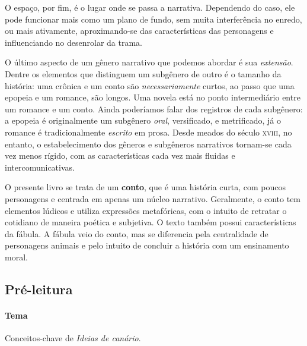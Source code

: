 \documentclass[11pt]{extarticle}
\begin{document}
O espaço, por fim, é o lugar onde se passa a narrativa. Dependendo do caso, ele pode funcionar mais como um plano de fundo, sem muita interferência no enredo, ou mais ativamente, aproximando-se das características das personagens e influenciando no desenrolar da trama. 


O último aspecto de um gênero narrativo que podemos abordar é sua \textit{extensão}. Dentre os elementos que distinguem um subgênero de outro é o tamanho da história: uma crônica e um conto são \textit{necessariamente} curtos, ao passo que uma epopeia e um romance, são longos. Uma novela está no ponto intermediário entre um romance e um conto. Ainda poderíamos falar dos registros de cada subgênero: a epopeia é originalmente um subgênero \textit{oral}, versificado, e metrificado, já o romance é tradicionalmente \textit{escrito} em prosa.  Desde meados do século \textsc{xviii}, no entanto, o estabelecimento dos gêneros e subgêneros narrativos tornam-se cada vez menos rígido, com as características cada vez mais fluidas e intercomunicativas.

O presente livro se trata de um \textbf{conto}, que é uma história curta, com poucos personagens e centrada em apenas um núcleo narrativo. Geralmente, o conto tem elementos lúdicos e utiliza expressões metafóricas, com o intuito de retratar o cotidiano de maneira poética e subjetiva. O texto também possui características da fábula. A fábula veio do conto, mas se diferencia pela centralidade de personagens animais e pelo intuito de concluir a história com um ensinamento moral.

\subsection{Pré-leitura}


\paragraph{Tema} Conceitos-chave de \textit{Ideias de canário}.
\end{document}
